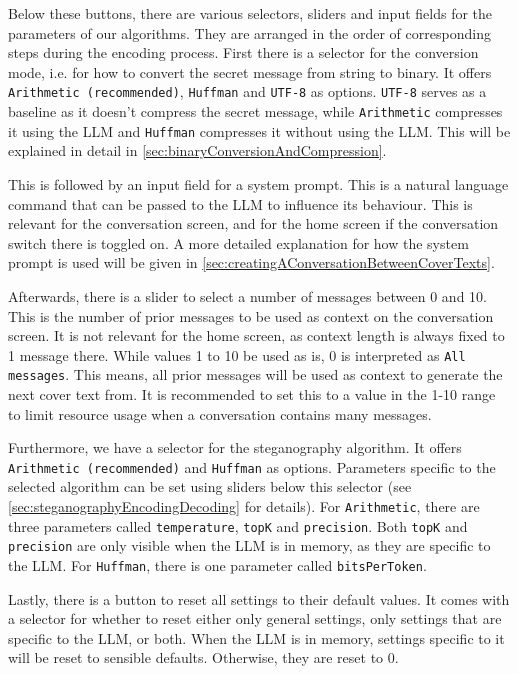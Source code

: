 Below these buttons, there are various selectors, sliders and input fields for the parameters of our algorithms. They are arranged in the order of corresponding steps during the encoding process. First there is a selector for the conversion mode, i.e. for how to convert the secret message from string to binary. It offers \lstinline|Arithmetic (recommended)|, \lstinline|Huffman| and \lstinline|UTF-8| as options. \lstinline|UTF-8| serves as a baseline as it doesn't compress the secret message, while \lstinline|Arithmetic| compresses it using the \gls{LLM} and \lstinline|Huffman| compresses it without using the \gls{LLM}. This will be explained in detail in \cref{sec:binaryConversionAndCompression}.

This is followed by an input field for a system prompt. This is a natural language command that can be passed to the \gls{LLM} to influence its behaviour. This is relevant for the conversation screen, and for the home screen if the conversation switch there is toggled on. A more detailed explanation for how the system prompt is used will be given in \cref{sec:creatingAConversationBetweenCoverTexts}.

Afterwards, there is a slider to select a number of messages between 0 and 10. This is the number of prior messages to be used as context on the conversation screen. It is not relevant for the home screen, as context length is always fixed to 1 message there. While values 1 to 10 be used as is, 0 is interpreted as \lstinline|All messages|. This means, all prior messages will be used as context to generate the next cover text from. It is recommended to set this to a value in the 1-10 range to limit resource usage when a conversation contains many messages.

Furthermore, we have a selector for the steganography algorithm. It offers \lstinline|Arithmetic (recommended)| and \lstinline|Huffman| as options. Parameters specific to the selected algorithm can be set using sliders below this selector (see \cref{sec:steganographyEncodingDecoding} for details). For \lstinline|Arithmetic|, there are three parameters called \lstinline|temperature|, \lstinline|topK| and \lstinline|precision|. Both \lstinline|topK| and \lstinline|precision| are only visible when the \gls{LLM} is in memory, as they are specific to the \gls{LLM}. For \lstinline|Huffman|, there is one parameter called \lstinline|bitsPerToken|.

Lastly, there is a button to reset all settings to their default values. It comes with a selector for whether to reset either only general settings, only settings that are specific to the \gls{LLM}, or both. When the \gls{LLM} is in memory, settings specific to it will be reset to sensible defaults. Otherwise, they are reset to 0.

